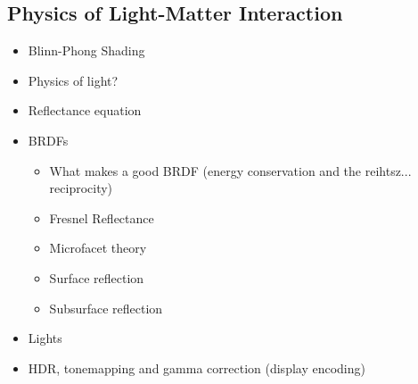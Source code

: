 \subsection{Physics of Light-Matter Interaction} \label{PhysicsOfLightMatterInteraction}

\begin{itemize}
	\item Blinn-Phong Shading
	\item Physics of light?
	\item Reflectance equation
	\item BRDFs
	\begin{itemize}
		\item What makes a good BRDF (energy conservation and the reihtsz... reciprocity)
		\item Fresnel Reflectance
		\item Microfacet theory
		\item Surface reflection
		\item Subsurface reflection
	\end{itemize}
	\item Lights
	\item HDR, tonemapping and gamma correction (display encoding)
\end{itemize}

